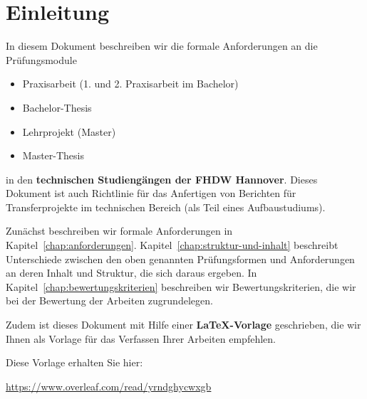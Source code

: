 \chapter{Einleitung}
\label{chap:einleitung}

In diesem Dokument beschreiben wir die  formale Anforderungen an die Prüfungsmodule
\begin{itemize}
    \item Praxisarbeit (1. und 2. Praxisarbeit im Bachelor)
    \item Bachelor-Thesis
    \item Lehrprojekt (Master)
    \item Master-Thesis
\end{itemize}
in den \textbf{technischen Studiengängen der FHDW Hannover}.
Dieses Dokument ist auch Richtlinie für das Anfertigen von Berichten für Transferprojekte im technischen Bereich (als Teil eines Aufbaustudiums). 

Zunächst beschreiben wir formale Anforderungen in Kapitel~\ref{chap:anforderungen}. Kapitel~\ref{chap:struktur-und-inhalt} beschreibt Unterschiede zwischen den oben genannten Prüfungsformen und Anforderungen an deren Inhalt und Struktur, die sich daraus ergeben. In Kapitel~\ref{chap:bewertungskriterien} beschreiben wir Bewertungskriterien, die wir bei der Bewertung der Arbeiten zugrundelegen.

Zudem ist dieses Dokument mit Hilfe einer \textbf{\LaTeX{}-Vorlage} geschrieben, die wir Ihnen als Vorlage für das Verfassen Ihrer Arbeiten empfehlen.

Diese Vorlage erhalten Sie hier:

\begin{center}
    \url{https://www.overleaf.com/read/yrndghycwxgb}
\end{center}



